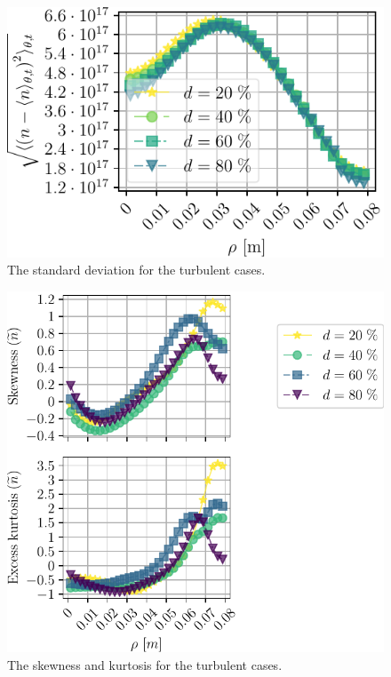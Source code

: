 %
\begin{figure}[htb]
    \centering
    \includegraphics{fig/results/neutral/nnScanPosOfFluct}
    \caption{The standard deviation for the turbulent cases.}
    \label{fig:nnScanPosOfFluct}
\end{figure}
%

%
\begin{figure}[htb]
    \centering
    \includegraphics{fig/results/neutral/nnScanSkewKurt}
    \caption{The skewness and kurtosis for the turbulent cases.}
    \label{fig:nnScanSkewKurt}
\end{figure}
%

